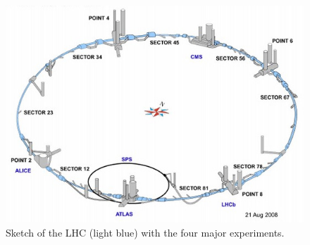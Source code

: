\begin{figure}[]
		\includegraphics[width=\textwidth]{pictures/lhc.jpg}
		\caption{Sketch of the LHC (light blue) with the four major experiments.}
		\label{fig:lhc_sketch}
\end{figure}


